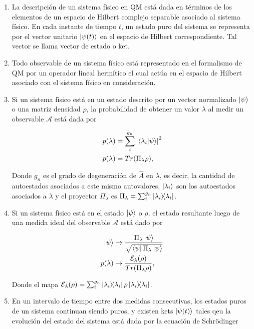 \begin{enumerate}
    \item La descripción de un sistema físico en QM está dada en términos de los elementos de un espacio de Hilbert complejo separable asociado al sistema físico. En cada instante de tiempo $t$, un estado puro del sistema se representa por el vector unitario $\ket{\psi(t)}$ en el espacio de Hilbert correspondiente. Tal vector se llama vector de estado o ket.
    \item Todo observable de un sistema físico está representado en el formalismo de QM por un operador lineal hermítico el cual actúa en el espacio de Hilbert asociado con el sistema físico en consideración.
    \item Si un sistema físico está en un estado descrito por un vector normalizado $\ket{\psi}$ o una matriz densidad $\rho$, la probabilidad de obtener un valor $\lambda$ al medir un observable $\mathcal{A}$ está dada por 
        
        \begin{align}
            p(\lambda) &= \sum\limits_i^{g_n} \abs{\braket{\lambda_i}{\psi}}^2 \\
            p(\lambda) &= Tr(\Pi_\lambda \rho) ,
        \end{align}

        Donde $g_n$ es el grado de degeneración de $\hat{A}$ en $\lambda$, es decir, la cantidad de autoestados asociados a este mismo autovalores, $\ket{\lambda_i}$ son los autoestados asociados a $\lambda$ y el proyector $\Pi_\lambda$ es $\Pi_\lambda = \sum_i^{g_n} \ketbra{\lambda_i}$.

    \item Si un sistema físico está en el estado $\ket{\psi}$ o $\rho$, el estado resultante luego de una medida ideal del observable $\mathcal{A}$ está dado por

        \begin{align}
            \ket{\psi} &\rightarrow \frac{\Pi_\lambda \ket{\psi}}{\sqrt{\bra{\psi} \Pi_\lambda \ket{\psi}}} \\
            p(\lambda) &\rightarrow \frac{\mathcal{E}_\lambda(\rho)}{Tr(\Pi_\lambda \rho)} ,
        \end{align}

        Donde el mapa $\mathcal{E}_\lambda(\rho) = \sum_i^{g_n} \ketbra{\lambda_i} \rho \ketbra{\lambda_i}$.

    \item En un intervalo de tiempo entre dos medidas consecutivas, los estados puros de un sistema continuan siendo puros, y existen kets $\ket{\psi(t)}$ tales qeu la evolución del estado del sistema está dada por la ecuación de Schrödinger


\end{enumerate}
